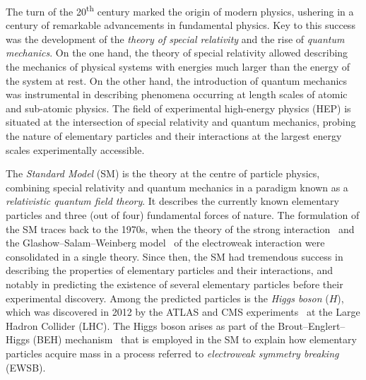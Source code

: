 The turn of the 20\textsuperscript{th} century marked the origin of modern
physics, ushering in a century of remarkable advancements in fundamental
physics. Key to this success was the development of the \emph{theory of special
  relativity} and the rise of \emph{quantum mechanics}. On the one hand, the
theory of special relativity
%
%
%
%
%
allowed describing the mechanics of physical systems with energies much larger
than the energy of the system at rest. On the other hand, the introduction of
quantum mechanics was instrumental in describing phenomena occurring at length
scales of atomic and sub-atomic physics. The field of experimental high-energy
physics (HEP) is situated at the intersection of special relativity and quantum
mechanics, probing the nature of elementary particles and their interactions at
the largest energy scales experimentally accessible.



The \emph{Standard Model} (SM) is the theory at the centre of particle physics,
combining special relativity and quantum mechanics in a paradigm known as a
\emph{relativistic quantum field theory}. It describes the currently known
elementary particles and three (out of four) fundamental forces of nature. The
formulation of the SM traces back to the 1970s, when the theory of the strong
interaction~\cite{Fritzsch:1973pi,Gross:1973id,Politzer:1973fx} and the Glashow--Salam--Weinberg
model~\cite{Glashow:1961tr,Salam:1964ry,Weinberg:1967tq} of the electroweak
interaction were consolidated in a single theory. Since then, the SM had
tremendous success in describing the properties of elementary particles and
their interactions, and notably in predicting the existence of several
elementary particles before their experimental discovery. Among the predicted
particles is the \emph{Higgs boson} ($H$), which was discovered in 2012 by the
ATLAS and CMS experiments~\cite{HIGG-2012-27,CMS-HIG-12-028} at the Large Hadron
Collider (LHC). The Higgs boson arises as part of the Brout--Englert--Higgs
(BEH) mechanism~\cite{Englert:1964et,Higgs:1964pj} that is employed in the SM to
explain how elementary particles acquire mass in a process referred to
\emph{electroweak symmetry breaking} (EWSB).


